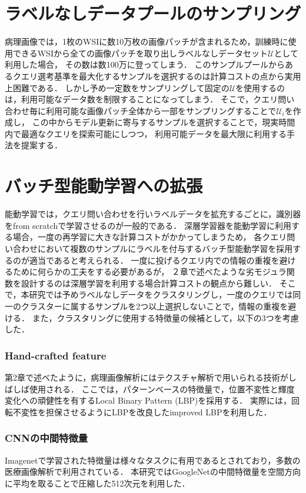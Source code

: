 \section{ラベルなしデータプールのサンプリング}
病理画像では，1枚のWSIに数10万枚の画像パッチが含まれるため，訓練時に使用できるWSIから全ての画像パッチを取り出しラベルなしデータセット$\mathcal{U}$として利用した場合，
その数は数100万に登ってしまう．
このサンプルプールからあるクエリ選考基準を最大化するサンプルを選択するのは計算コストの点から実用上困難である．
しかし予め一定数をサンプリングして固定の$\mathcal{U}$を使用するのは，利用可能なデータ数を制限することになってしまう．
そこで，クエリ問い合わせ毎に利用可能な画像パッチ全体から一部をサンプリングすることで$\mathcal{U}_i$を作成し，
この中からモデル更新に寄与するサンプルを選択することで，現実時間内で最適なクエリを探索可能にしつつ，
利用可能データを最大限に利用する手法を提案する．

\section{バッチ型能動学習への拡張}
能動学習では，クエリ問い合わせを行いラベルデータを拡充するごとに，識別器をfrom scratchで学習させるのが一般的である．
深層学習器を能動学習に利用する場合，一度の再学習に大きな計算コストがかかってしまうため，
各クエリ問い合わせにおいて複数のサンプルにラベルを付与するバッチ型能動学習を採用するのが適当であると考えられる．
一度に投げるクエリ内での情報の重複を避けるために何らかの工夫をする必要があるが，
２章で述べたような劣モジュラ関数を設計するのは深層学習を利用する場合計算コストの観点から難しい．
そこで，本研究では予めラベルなしデータをクラスタリングし，一度のクエリでは同一のクラスターに属するサンプルを2つ以上選択しないことで，情報の重複を避ける．
また，クラスタリングに使用する特徴量の候補として，以下の3つを考慮した．

\subsubsection{Hand-crafted feature}
第2章で述べたように，病理画像解析にはテクスチャ解析で用いられる技術がしばしば使用される．
ここでは，パターンベースの特徴量で，位置不変性と輝度変化への頑健性を有するLocal Binary Pattern (LBP)\cite{ojala2002multiresolution}を採用する．
実際には，回転不変性を担保させるようにLBPを改良したimproved LBPを利用した．

\subsubsection{CNNの中間特徴量}
Imagenetで学習された特徴量は様々なタスクに有用であるとされており，多数の医療画像解析で利用されている．
本研究ではGoogleNet\cite{szegedy2015going}の中間特徴量を空間方向に平均を取ることで圧縮した512次元を利用した．

